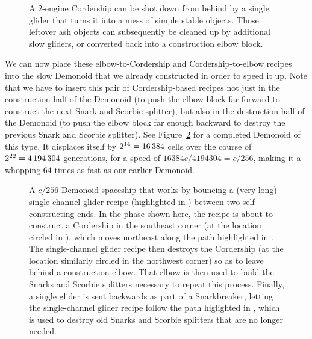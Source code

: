 \begin{figure}[!htb]
	\centering
	
	\caption{A $2$-engine Cordership can be shot down from behind by a single glider that turns it into a mess of simple stable objects. Those leftover ash objects can subsequently be cleaned up by additional slow gliders, or converted back into a construction elbow block.}\label{fig:cordership_shoot_down}
\end{figure}

We can now place these elbow-to-Cordership and Cordership-to-elbow recipes into the slow Demonoid that we already constructed in order to speed it up. Note that we have to insert this pair of Cordership-based recipes not just in the construction half of the Demonoid (to push the elbow block far forward to construct the next Snark and Scorbie splitter), but also in the destruction half of the Demonoid (to push the elbow block far enough backward to destroy the previous Snark and Scorbie splitter). See Figure~\ref{fig:c256_demonoid} for a completed Demonoid of this type. It displaces itself by $2^{14} = 16{\,}384$ cells over the course of $2^{22} = 4{\,}194{\,}304$ generations, for a speed of $16384c/4194304 = c/256$, making it a whopping $64$ times as fast as our earlier Demonoid.

\begin{figure}[!htb]
	\centering
	\caption{A $c/256$ Demonoid spaceship that works by bouncing a (very long) single-channel glider recipe (highlighted in ) between two self-constructing ends. In the phase shown here, the recipe is about to construct a Cordership in the southeast corner (at the location circled in ), which moves northeast along the path highlighted in . The single-channel glider recipe then destroys the Cordership (at the location similarly circled in the northwest corner) so as to leave behind a construction elbow. That elbow is then used to build the Snarks and Scorbie splitters necessary to repeat this process. Finally, a single glider is sent backwards as part of a Snarkbreaker, letting the single-channel glider recipe follow the path higlighted in , which is used to destroy old Snarks and Scorbie splitters that are no longer needed.}\label{fig:c256_demonoid}
\end{figure}

